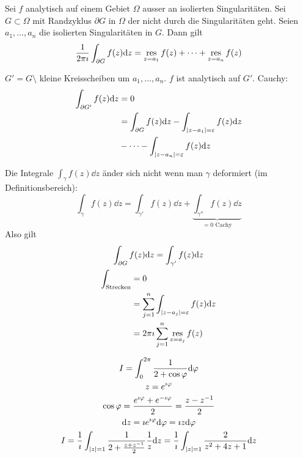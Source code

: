\begin{satz*}[note = Residuumsatz , index = Residuum satz , indexformat = {2!1-~ 1!~-2 1.2}]
	Sei $f$ analytisch auf einem Gebiet $\Omega$ ausser an isolierten Singularitäten. Sei $G \subset \Omega$ mit Randzyklus $\partial G$ in $\Omega$ der nicht durch die Singularitäten geht. Seien $a_1 , \dotsc , a_n$ die isolierten Singularitäten in $G$. Dann gilt
	\[ \frac{1}{2\pi\imath} \int_{\partial G} f(z) \dd z = \operatorname*{res}_{z=a_1} f(z) + \dotsb + \operatorname*{res}_{z=a_n} f(z) \]
	\begin{bew}
		$G' = G \setminus$ kleine Kreisscheiben um $a_1 , \dotsc , a_n$. $f$ ist analytisch auf $G'$. Cauchy:
		\[ \begin{split}
			\int_{\partial G'} f(z) \dd z
				&= 0 \\
				&= \int_{\partial G} f(z) \dd z - \int_{\abs{z-a_1} = \varepsilon} f(z) \dd z \\
				&- \dotsb - \int_{\abs{z-a_n} = \varepsilon} f(z) \dd z
		\end{split} \]
	\end{bew}
	\begin{bew}[note = 2. Erklärung]
		Die Integrale $\int_\gamma f(z) \dd z$ änder sich nicht wenn man $\gamma$ deformiert (im Definitionsbereich):
		\[ \int_\gamma f(z) \dd z = \int_{\gamma'} f(z) \dd z + \underbrace{\int_{\gamma''} f(z) \dd z}_{=0 \text{ Cachy}} \]
		Also gilt
		\begin{gather*}
			\int_{\partial G} f(z) \dd z = \int_{\gamma'} f(z) \dd z \\
			\begin{split}
				\int_{\text{Strecken}}
					&= 0 \\
					&= \sum_{j=1}^n \int_{\abs{z-a_j} = \varepsilon} f(z) \dd z \\
					&= 2\pi\imath \sum _{j=1}^n \operatorname*{res}_{z=a_j} f(z)
			\end{split}
		\end{gather*}
	\end{bew}
\end{satz*}
\begin{bsp*}
	\begin{gather*}
		I = \int_0^{2\pi} \frac{1}{2 + \cos \varphi} \dd \varphi \\
		z = e^{\imath\varphi} \\
		\cos \varphi = \frac{e^{\imath\varphi} + e^{-\imath\varphi}}{2} = \frac{z - z^{-1}}{2} \\
		\dd z = \imath e^{\imath\varphi} \dd \varphi= \imath z \dd \varphi \\
		I = \frac{1}{\imath} \int_{\abs{z}=1} \frac{1}{2 + \frac{z + z^{-1}}{2}} \frac{1}{z} \dd z = \frac{1}{\imath} \int_{\abs{z}=1} \frac{2}{z^2 + 4z + 1} \dd z
	\end{gather*}
\end{bsp*}

